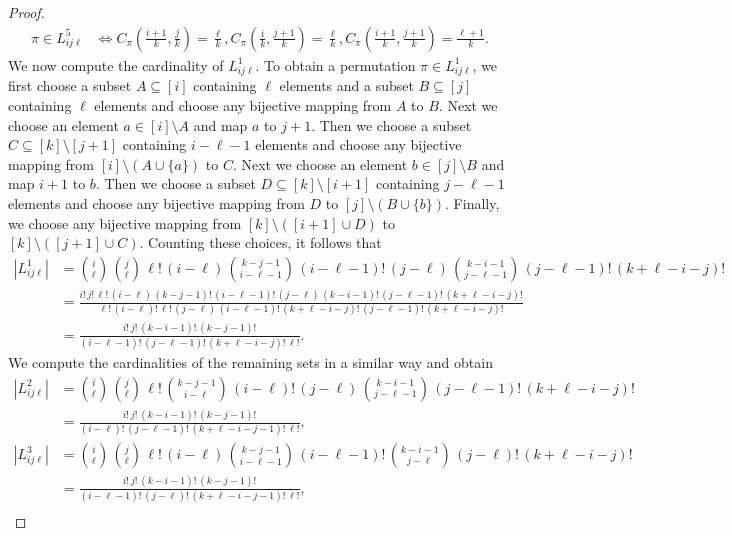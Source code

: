 \documentclass[12pt,a4paper]{amsart}
\theoremstyle{definition}
\begin{document}
\begin{proof}
\begin{align*}
   \pi \in L_{ij\ell}^5 &\Leftrightarrow C_\pi(\tfrac{i+1}{k},\tfrac{j}{k}) = \tfrac{\ell}{k},  C_\pi(\tfrac{i}{k},\tfrac{j+1}{k}) = \tfrac{\ell}{k},  C_\pi(\tfrac{i+1}{k},\tfrac{j+1}{k}) = \tfrac{\ell+1}{k}.
\end{align*}
We now compute the cardinality of $ L_{ij\ell}^1$.
To obtain a permutation $\pi\in L_{ij\ell}^1$, we first choose a subset $A \subseteq [i]$ containing $\ell$ elements and a subset $B \subseteq [j]$ containing $\ell$ elements and choose any bijective mapping from $A$ to $B$. Next we choose an element $a \in [i] \setminus A$ and map $a$ to $j+1$. Then we choose a subset $C \subseteq [k]\setminus [j+1]$ containing $i-\ell-1$ elements and choose any bijective mapping from $[i]\setminus (A\cup\{a\})$ to $C$. Next we choose an element $b \in [j] \setminus B$ and map $i+1$ to $b$. Then we choose a subset $D \subseteq [k]\setminus [i+1]$ containing $j-\ell-1$ elements and choose any bijective mapping from $D$ to $[j]\setminus (B\cup\{b\})$. Finally, we choose any bijective mapping from $[k]\setminus([i+1]\cup D)$ to $[k]\setminus([j+1]\cup C)$. Counting these choices, it follows that 
\begin{align*}
   |L_{ij\ell}^1| &= \binom{i}{\ell} \, \binom{j}{\ell} \, \ell! \, (i-\ell) \, \binom{k-j-1}{i-\ell-1} \, (i-\ell-1)! \, (j-\ell) \, \binom{k-i-1}{j-\ell-1} \, (j-\ell-1)! \,(k+\ell-i-j)! \\ 
   &= \frac{i! \,j! \, \ell!\, (i-\ell) \, (k-j-1)! \,(i-\ell-1)! \,(j-\ell) \, (k-i-1)! \,(j-\ell-1)! \, (k+\ell-i-j)!}{\ell! \, (i-\ell)! \, \ell! \, (j-\ell) \, (i-\ell-1)! \, (k+\ell-i-j)! \, (j-\ell-1)! \, (k+\ell-i-j)!} \\
   &= \frac{i! \, j! \, (k-i-1)! \, (k-j-1)!}{(i-\ell-1)! \, (j-\ell-1)! \, (k+\ell-i-j)! \, \ell!}. 
\end{align*}
We compute the cardinalities of the remaining sets in a similar way and obtain
\begin{align*}
   |L_{ij\ell}^2| &= \binom{i}{\ell} \, \binom{j}{\ell} \, \ell! \, \binom{k-j-1}{i-\ell} \, (i-\ell)! \, (j-\ell) \, \binom{k-i-1}{j-\ell-1} \, (j-\ell-1)! \,(k+\ell-i-j)! \\ 
   &= \frac{i! \, j! \, (k-i-1)! \, (k-j-1)!}{(i-\ell)! \, (j-\ell-1)! \, (k+\ell-i-j-1)! \, \ell!}, \\ 
   |L_{ij\ell}^3| &= \binom{i}{\ell} \, \binom{j}{\ell} \, \ell! \, (i-\ell) \, \binom{k-j-1}{i-\ell-1} \, (i-\ell-1)! \, \binom{k-i-1}{j-\ell} \, (j-\ell)! \,(k+\ell-i-j)! \\ 
   &= \frac{i! \, j! \, (k-i-1)! \, (k-j-1)!}{(i-\ell-1)! \, (j-\ell)! \, (k+\ell-i-j-1)! \, \ell!}, \\ 

\end{align*}
\end{proof}
\end{document}
